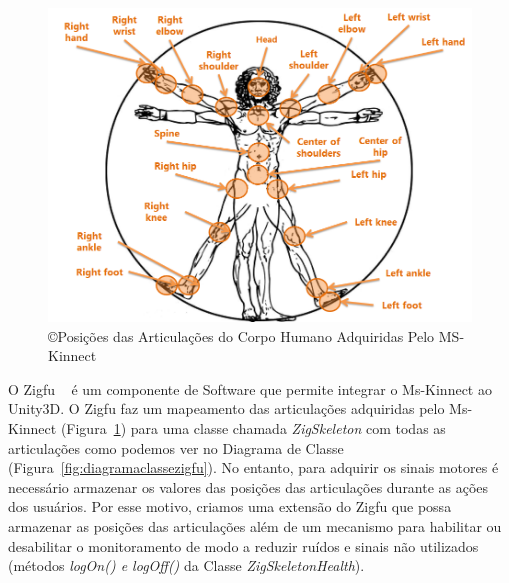 \begin{figure}[!htbp]
 \centering
 \includegraphics[scale=0.4]{./img/articulacoes.png}
\caption[Posições das Articulações do Corpo Humano Adquiridas Pelo MS-Kinnect]{\copyright Posições das Articulações do Corpo Humano Adquiridas Pelo MS-Kinnect ~\cite{kinnect2013}}
 \label{fig:articulacoeskinnect}
\end{figure}

O Zigfu ~\cite{zigfu} é um componente de Software que permite integrar o Ms-Kinnect ao Unity3D. O Zigfu faz um mapeamento das articulações adquiridas pelo Ms-Kinnect (Figura~\ref{fig:articulacoeskinnect}) para uma classe chamada \textit{ZigSkeleton} com todas as articulações como podemos ver no Diagrama de Classe (Figura~\ref{fig:diagramaclassezigfu}). No entanto, para adquirir os sinais motores é necessário armazenar os valores das posições das articulações durante as ações dos usuários. Por esse motivo, criamos uma extensão do Zigfu que possa armazenar as posições das articulações além de um mecanismo para habilitar ou desabilitar o monitoramento de modo a reduzir ruídos e sinais não utilizados (métodos \textit{logOn() e logOff()} da Classe \textit{ZigSkeletonHealth}).

